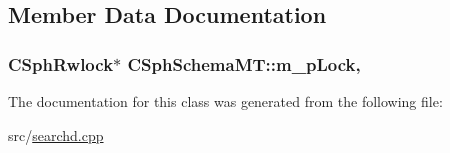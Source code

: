 \subsection{Member Data Documentation}
\hypertarget{classCSphSchemaMT_a147802056c8e0557842290835bcb005d}{
\subsubsection[{m\-\_\-p\-Lock}]{\setlength{\rightskip}{0pt plus 5cm}C\-Sph\-Rwlock$\ast$ C\-Sph\-Schema\-M\-T\-::m\-\_\-p\-Lock\hspace{0.3cm}{\ttfamily [mutable]}, {\ttfamily [private]}}}\label{classCSphSchemaMT_a147802056c8e0557842290835bcb005d}


The documentation for this class was generated from the following file\-:\begin{DoxyCompactItemize}
\item 
src/\hyperlink{searchd_8cpp}{searchd.\-cpp}\end{DoxyCompactItemize}
